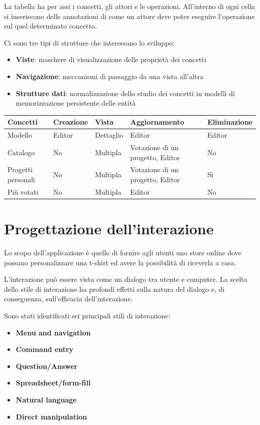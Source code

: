 \documentclass[12pt,italian,]{report}
\providecommand{\tightlist}{%
  \setlength{\itemsep}{0pt}\setlength{\parskip}{0pt}}
\begin{document}
La tabella ha per assi i concetti, gli attori e le operazioni. All'interno di ogni cella si inseriscono delle annotazioni di come un attore deve poter eseguire l'operazione sul quel determinato concetto.

Ci sono tre tipi di strutture che interessano lo sviluppo:

\begin{itemize}
\tightlist
\item
  \textbf{Viste}: maschere di visualizzazione delle proprietà dei
  concetti
\item
  \textbf{Navigazione}: meccanismi di passaggio da una vista all'altra
\item
  \textbf{Strutture dati}: normalizzazione dello studio dei concetti in
  modelli di memorizzazione persistente delle entità
\end{itemize}

\begin{longtable}[]{@{}lllll@{}}
\toprule
Concetti & Creazione & Vista & Aggiornamento &
Eliminazione\tabularnewline
\midrule
\endhead
Modello & Editor & Dettaglio & Editor & Editor\tabularnewline
Catalogo & No & Multipla & Votazione di un progetto, Editor & No\tabularnewline
Progetti personali & No & Multipla & Votazione di un progetto, Editor & Sì\tabularnewline
Più votati & No & Multipla & Editor & No\tabularnewline
\bottomrule
\end{longtable}

\hypertarget{progettazione-dellinterazione}{%
\section{Progettazione
dell'interazione}\label{progettazione-dellinterazione}}

Lo scopo dell'applicazione è quello di fornire agli utenti uno store
online dove possano personalizzare una t-shirt ed avere la possibilità
di riceverla a casa.

L'interazione può essere vista come un dialogo tra utente e computer. La
scelta dello stile di interazione ha profondi effetti sulla natura del
dialogo e, di conseguenza, sull'efficacia dell'interazione.

Sono stati identificati sei principali stili di interazione:

\begin{itemize}
\tightlist
\item
  \textbf{Menu and navigation}
\item
  \textbf{Command entry}
\item
  \textbf{Question/Answer}
\item
  \textbf{Spreadsheet/form-fill}
\item
  \textbf{Natural language}
\item
  \textbf{Direct manipulation}
\end{itemize}
\end{document}
